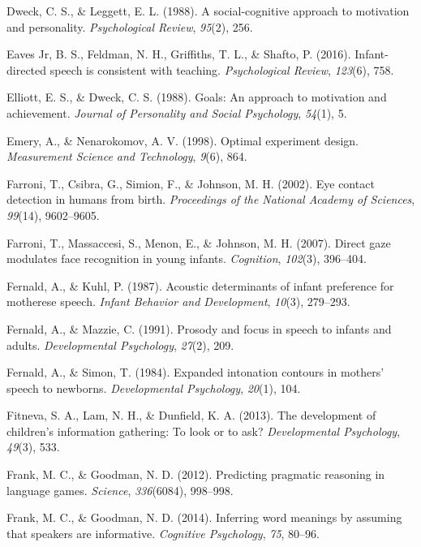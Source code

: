 \documentclass[english,floatsintext,man]{apa6}
\theoremstyle{definition}
\theoremstyle{definition}
\theoremstyle{definition}
\theoremstyle{remark}
\begin{document}
\hypertarget{ref-dweck1988social}{}
Dweck, C. S., \& Leggett, E. L. (1988). A social-cognitive approach to
motivation and personality. \emph{Psychological Review}, \emph{95}(2),
256.

\hypertarget{ref-eaves2016infant}{}
Eaves Jr, B. S., Feldman, N. H., Griffiths, T. L., \& Shafto, P. (2016).
Infant-directed speech is consistent with teaching. \emph{Psychological
Review}, \emph{123}(6), 758.

\hypertarget{ref-elliott1988goals}{}
Elliott, E. S., \& Dweck, C. S. (1988). Goals: An approach to motivation
and achievement. \emph{Journal of Personality and Social Psychology},
\emph{54}(1), 5.

\hypertarget{ref-emery1998optimal}{}
Emery, A., \& Nenarokomov, A. V. (1998). Optimal experiment design.
\emph{Measurement Science and Technology}, \emph{9}(6), 864.

\hypertarget{ref-farroni2002eye}{}
Farroni, T., Csibra, G., Simion, F., \& Johnson, M. H. (2002). Eye
contact detection in humans from birth. \emph{Proceedings of the
National Academy of Sciences}, \emph{99}(14), 9602--9605.

\hypertarget{ref-farroni2007direct}{}
Farroni, T., Massaccesi, S., Menon, E., \& Johnson, M. H. (2007). Direct
gaze modulates face recognition in young infants. \emph{Cognition},
\emph{102}(3), 396--404.

\hypertarget{ref-fernald1987acoustic}{}
Fernald, A., \& Kuhl, P. (1987). Acoustic determinants of infant
preference for motherese speech. \emph{Infant Behavior and Development},
\emph{10}(3), 279--293.

\hypertarget{ref-fernald1991prosody}{}
Fernald, A., \& Mazzie, C. (1991). Prosody and focus in speech to
infants and adults. \emph{Developmental Psychology}, \emph{27}(2), 209.

\hypertarget{ref-fernald1984expanded}{}
Fernald, A., \& Simon, T. (1984). Expanded intonation contours in
mothers' speech to newborns. \emph{Developmental Psychology},
\emph{20}(1), 104.

\hypertarget{ref-fitneva2013development}{}
Fitneva, S. A., Lam, N. H., \& Dunfield, K. A. (2013). The development
of children's information gathering: To look or to ask?
\emph{Developmental Psychology}, \emph{49}(3), 533.

\hypertarget{ref-frank2012predicting}{}
Frank, M. C., \& Goodman, N. D. (2012). Predicting pragmatic reasoning
in language games. \emph{Science}, \emph{336}(6084), 998--998.

\hypertarget{ref-frank2014inferring}{}
Frank, M. C., \& Goodman, N. D. (2014). Inferring word meanings by
assuming that speakers are informative. \emph{Cognitive Psychology},
\emph{75}, 80--96.
\end{document}
